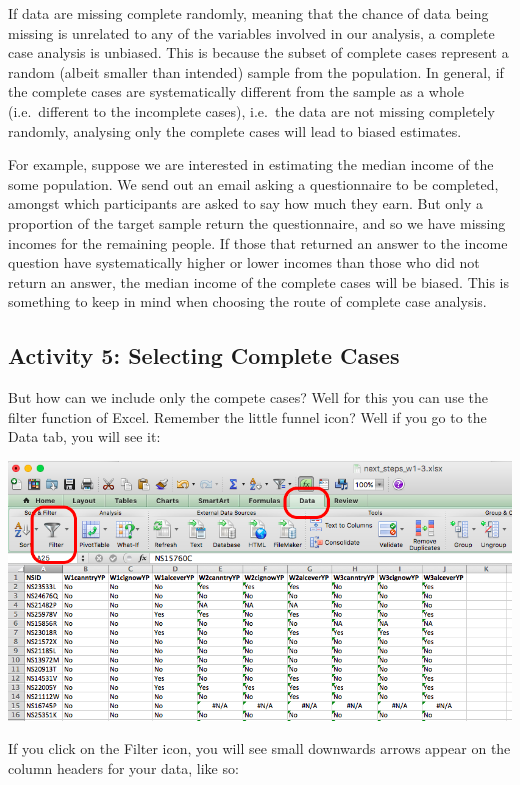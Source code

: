\documentclass[]{book}
\theoremstyle{definition}
\theoremstyle{definition}
\theoremstyle{definition}
\theoremstyle{remark}
\begin{document}
If data are missing complete randomly, meaning that the chance of data
being missing is unrelated to any of the variables involved in our
analysis, a complete case analysis is unbiased. This is because the
subset of complete cases represent a random (albeit smaller than
intended) sample from the population. In general, if the complete cases
are systematically different from the sample as a whole (i.e.~different
to the incomplete cases), i.e.~the data are not missing completely
randomly, analysing only the complete cases will lead to biased
estimates.

For example, suppose we are interested in estimating the median income
of the some population. We send out an email asking a questionnaire to
be completed, amongst which participants are asked to say how much they
earn. But only a proportion of the target sample return the
questionnaire, and so we have missing incomes for the remaining people.
If those that returned an answer to the income question have
systematically higher or lower incomes than those who did not return an
answer, the median income of the complete cases will be biased. This is
something to keep in mind when choosing the route of complete case
analysis.

\hypertarget{activity-5-selecting-complete-cases}{%
\subsection{Activity 5: Selecting Complete
Cases}\label{activity-5-selecting-complete-cases}}

But how can we include only the compete cases? Well for this you can use
the filter function of Excel. Remember the little funnel icon? Well if
you go to the Data tab, you will see it:

\includegraphics{imgs/cc_filter.png}

If you click on the Filter icon, you will see small downwards arrows
appear on the column headers for your data, like so:
\end{document}
